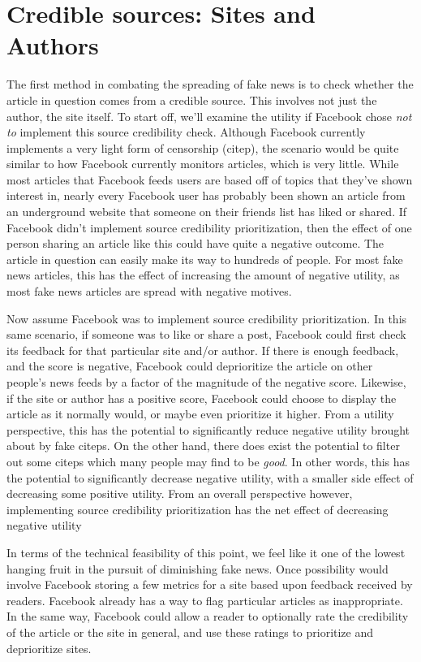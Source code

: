 \documentclass[12pt]{article}
\begin{document}
\section{Credible sources: Sites and Authors}
The first method in combating the spreading of fake news is to check whether the article in question comes from a credible source. This involves not just the author, the site itself. To start off, we'll examine the utility if Facebook chose \textit{not to} implement this source credibility check. Although Facebook currently implements a very light form of censorship (citep), the scenario would be quite similar to how Facebook currently monitors articles, which is very little. While most articles that Facebook feeds users are based off of topics that they've shown interest in, nearly every Facebook user has probably been shown an article from an underground website that someone on their friends list has liked or shared. If Facebook didn't implement source credibility prioritization, then the effect of one person sharing an article like this could have quite a negative outcome. The article in question can easily make its way to hundreds of people. For most fake news articles, this has the effect of increasing the amount of negative utility, as most fake news articles are spread with negative motives.

Now assume Facebook was to implement source credibility prioritization. In this same scenario, if someone was to like or share a post, Facebook could first check its feedback for that particular site and/or author. If there is enough feedback, and the score is negative, Facebook could deprioritize the article on other people's news feeds by a factor of the magnitude of the negative score. Likewise, if the site or author has a positive score, Facebook could choose to display the article as it normally would, or maybe even prioritize it higher. From a utility perspective, this has the potential to significantly reduce negative utility brought about by fake citeps. On the other hand, there does exist the potential to filter out some citeps which many people may find to be \textit{good}. In other words, this has the potential to significantly decrease negative utility, with a smaller side effect of decreasing some positive utility. From an overall perspective however, implementing source credibility prioritization has the net effect of decreasing negative utility

In terms of the technical feasibility of this point, we feel like it one of the lowest hanging fruit in the pursuit of diminishing fake news. Once possibility would involve Facebook storing a few metrics for a site based upon feedback received by readers. Facebook already has a way to flag particular articles as inappropriate. In the same way, Facebook could allow a reader to optionally rate the credibility of the article or the site in general, and use these ratings to prioritize and deprioritize sites. 
\end{document}
